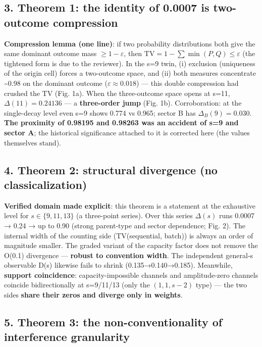 \documentclass[
]{ltjsarticle}
\begin{document}
\subsection{3. Theorem 1: the identity of 0.0007 is two-outcome
compression}\label{theorem-1-the-identity-of-0.0007-is-two-outcome-compression}

\textbf{Compression lemma (one line)}: if two probability distributions
both give the same dominant outcome mass \(\ge1-\varepsilon\), then
\(\mathrm{TV}=1-\sum\min(P,Q)\le\varepsilon\) (the tightened form is due
to the reviewer). In the s=9 twin, (i) exclusion (uniqueness of the
origin cell) forces a two-outcome space, and (ii) both measures
concentrate \textasciitilde0.98 on the dominant outcome
(\(\varepsilon\approx0.018\)) --- this double compression had crushed
the TV (Fig. 1a). When the three-outcome space opens at s=11,
\(\Delta(11)=0.24136\) --- a \textbf{three-order jump} (Fig. 1b).
Corroboration: at the single-decay level even s=9 shows 0.774 vs 0.965;
sector B has \(\Delta_B(9)=0.030\). \textbf{The proximity of 0.98195 and
0.98263 was an accident of s=9 and sector A}; the historical
significance attached to it is corrected here (the values themselves
stand).

\subsection{4. Theorem 2: structural divergence (no
classicalization)}\label{theorem-2-structural-divergence-no-classicalization}

\textbf{Verified domain made explicit}: this theorem is a statement at
the exhaustive level for \(s\in\{9,11,13\}\) (a three-point series).
Over this series \(\Delta(s)\) runs 0.0007 → 0.24 → up to 0.90 (strong
parent-type and sector dependence; Fig. 2). The internal width of the
counting side (TV(sequential, batch)) is always an order of magnitude
smaller. The graded variant of the capacity factor does not remove the
O(0.1) divergence --- \textbf{robust to convention width}. The
independent general-s observable D(s) likewise fails to shrink
(0.135→0.140→0.185). Meanwhile, \textbf{support coincidence}:
capacity-impossible channels and amplitude-zero channels coincide
bidirectionally at s=9/11/13 (only the \((1,1,s{-}2)\) type) --- the two
sides \textbf{share their zeros and diverge only in weights}.

\subsection{5. Theorem 3: the non-conventionality of interference
granularity}\label{theorem-3-the-non-conventionality-of-interference-granularity}
\end{document}
